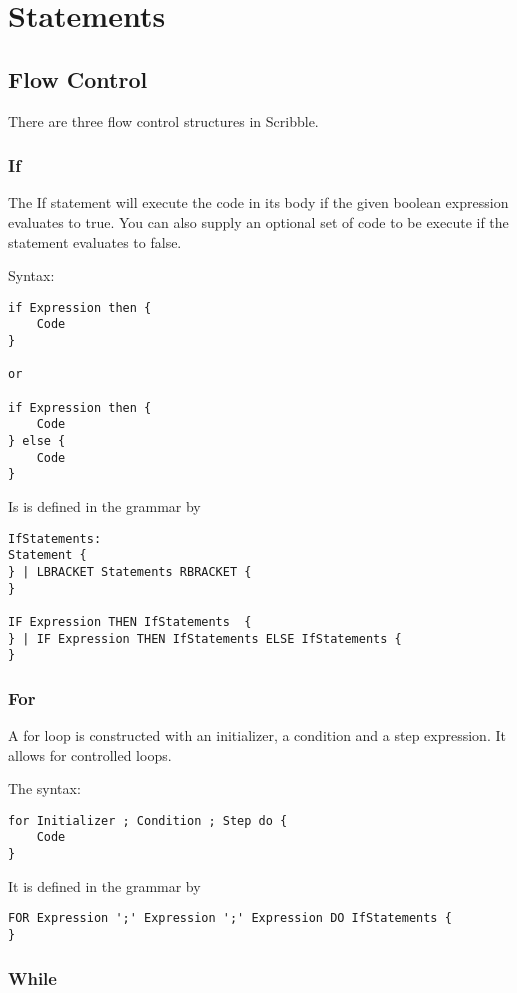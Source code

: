 \documentclass[]{final_report}
\begin{document}
\chapter{Statements}

\section{Flow Control}

There are three flow control structures in Scribble.

\subsection{If}

The If statement will execute the code in its body if the given boolean expression evaluates to true. You can also supply an optional set of code to be execute if the statement evaluates to false.

Syntax: 
\begin{verbatim}
if Expression then {
	Code
}

or

if Expression then {
	Code
} else {
	Code
}
\end{verbatim}

Is is defined in the grammar by
\begin{verbatim}
IfStatements: 
Statement {
} | LBRACKET Statements RBRACKET {
}

IF Expression THEN IfStatements  {
} | IF Expression THEN IfStatements ELSE IfStatements {
}
\end{verbatim}

\subsection{For}

A for loop is constructed with an initializer, a condition and a step expression. It allows for controlled loops.

The syntax: \begin{verbatim}
for Initializer ; Condition ; Step do {
	Code
}
\end{verbatim}

It is defined in the grammar by \begin{verbatim}
FOR Expression ';' Expression ';' Expression DO IfStatements {
}
\end{verbatim}

\subsection{While}
\end{document}
